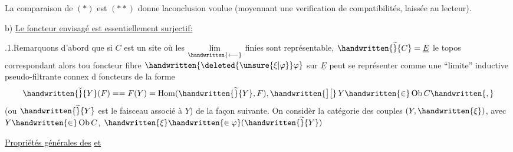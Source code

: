 \noindent La comparaison de $(*)$ est $(**)$ donne la\handwritten{$\mid$}conclusion voulue (moyennant une verification de compatibilités, laissée au lecteur).

\noindent{}%
b) \uline{Le foncteur envisagé est essentiellement surjectif:}

.1.\quad Remarquons d'abord que si $C$ est un site où les $\mathop{\underset{\handwritten{\longleftarrow}}{\mathrm{lim}}}\limits$ finies sont représentable, $\handwritten{\widetilde}{C} = \underline{E}$ le topos correspondant alors\handwritten{,} tou%
foncteur fibre $\handwritten{\deleted{\unsure{\xi|\varphi}}\varphi}$ sur $\underline E$ peut se représenter comme une ``limite''
\margin{\handwritten{$/\quad /\quad\varphi$}}
inductive pseudo-filtrante connex d foncteurs de la forme
\margin{\handwritten{$]\,[ $}}
\[
\handwritten{\check}{Y}(F) == F(Y) = \operatorname{Hom}(\handwritten{\widetilde}{Y},F),\handwritten{\big]\big[}\, Y\handwritten{\in}\operatorname{Ob} C\handwritten{,}
\]
(ou $\handwritten{\widetilde}{Y}$ est le faisceau associé à $Y$)\handwritten{,} de la façon suivante. On considèr
\margin{\handwritten{,}}
la catégorie des couples $(Y,\handwritten{\xi})$, avec $Y\handwritten{\in}\operatorname{Ob} C$, $\handwritten{\xi}\handwritten{\in\varphi}(\handwritten{\widetilde}{Y})$
\endgroup

\clearpage
{}
\noindent{}\quad
\uline{Propriétés générales des} \uline{ } \uline{et }

